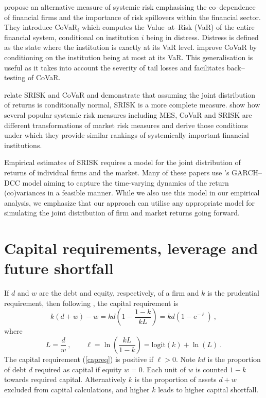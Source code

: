 \documentclass[authoryear]{elsarticle}
\newcommand{\logit}{\mathrm{logit}}
\newcommand{\e}{\mathrm{e}}
\newcommand{\eref}[1]{(\ref{#1})}
\newcommand{\cq}{\ , \qquad}
\newcommand{\be}[1]{\begin{equation}\label{#1}}
\newcommand{\ee}{\end{equation}}
\begin{document}
\cite{adrian2011covar} propose an alternative measure of systemic risk  emphasising the co--dependence of financial firms and the importance of risk spillovers within the financial sector. They introduce CoVaR$_i$ which computes the Value--at--Risk (VaR) of the entire financial system, conditional on institution $i$ being in distress. Distress is defined as the state where the institution is exactly at its VaR level. \cite{Girardi2013} improve CoVaR by conditioning on the institution being at most at its VaR. This generalisation is useful as it takes into account the severity of tail losses and facilitates back--testing of CoVaR. 

\cite{acharya2012aer} relate SRISK and CoVaR and demonstrate that assuming the joint distribution of returns is conditionally normal, SRISK is a more complete measure. \cite{Benoit2013} show how several popular systemic risk measures including MES, CoVaR and SRISK are different transformations of market risk measures and derive those conditions under which they provide similar rankings of systemically important financial institutions.

Empirical estimates of SRISK  requires a model for the joint distribution of returns of individual firms and the market. Many of these papers use \cite{engle2002dynamic}'s GARCH--DCC model aiming to capture the time-varying dynamics of the return (co)variances in a feasible manner. While we also use this model in our empirical analysis, we emphasize that our approach can utilise any appropriate model for simulating the joint distribution of firm and market returns going forward. 

\section{Capital requirements, leverage and future shortfall}\label{capshort}

If $d$ and $w$ are the debt and equity, respectively, of a  firm  and $k$ is the prudential requirement,  then  following \cite{brownlees2015}, the   capital requirement is
\be{capreq}
k (d+w)-w = k d\left(1-\frac{1-k}{kL}\right)=kd\left(1-\e^{-\ell}\right)
\ ,
\ee
where
\be{lev}
L=\frac{d}{w}\cq \ell=\ln\left(\frac{kL}{1-k}\right) = \logit(k) + \ln(L) \ .
\ee
The capital requirement \eref{capreq} is positive if $\ell>0$. Note $kd$ is the proportion of debt $d$ required as capital if equity $w=0$.  Each unit of  $w$ is counted $1-k$ towards required capital.     Alternatively $k$ is the proportion of assets $d+w$ excluded from capital calculations, and higher $k$ leads to higher capital shortfall.   
\end{document}
